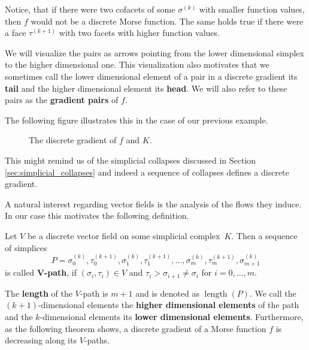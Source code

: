 Notice, that if there were two cofacets of some $\sigma^{(k)}$ with smaller function values, then $f$ would not be a discrete Morse function. The same holds true if there were a face $\tau^{(k+1)}$ with two facets with higher function values.

We will visualize the pairs as arrows pointing from the lower dimensional simplex to the higher dimensional one. This visualization also motivates that we sometimes call the lower dimensional element of a pair in a discrete gradient its \textbf{tail} and the higher dimensional element its \textbf{head}. We will also refer to these pairs as the \textbf{gradient pairs} of $f$.

The following figure illustrates this in the case of our previous example.

\begin{figure}[H]

\begin{subfigure}[c]{0.99\textwidth}
\begin{center}

\end{center}
\end{subfigure}

\caption{The discrete gradient of $f$ and $K$.}
\label{fig:discrete_gradient}
\end{figure}

This might remind us of the simplicial collapses discussed in Section \ref{sec:simplicial_collapses} and indeed a sequence of collapses defines a discrete gradient. 

A natural interest regarding vector fields is the analysis of the flows they induce. In our case this motivates the following definition.

\begin{defi}
Let $V$ be a discrete vector field on some simplicial complex~$K$. Then a sequence of simplices \[
P = \sigma_0^{(k)}, \tau_0^{(k+1)}, \sigma_1^{(k)}, \tau_1^{(k+1)}, \dots , \sigma_m^{(k)}, \tau_m^{(k+1)}, \sigma_{m+1}^{(k)}
\]
is called \textbf{$\bm{V}$-path}, if $(\sigma_i, \tau_i) \in V$ and $\tau_i > \sigma_{i+1} \neq \sigma_i$ for $i = 0,\dots,m$. 
\end{defi}

The \textbf{length} of the $V$-path is $m+1$ and is denoted as $\operatorname{length}(P)$. We call the $(k+1)$-dimensional elements the \textbf{higher dimensional elements} of the path and the $k$-dimensional elements its \textbf{lower dimensional elements}. Furthermore, as the following theorem
shows, a discrete gradient of a Morse function $f$ is decreasing along its $V$-paths.

